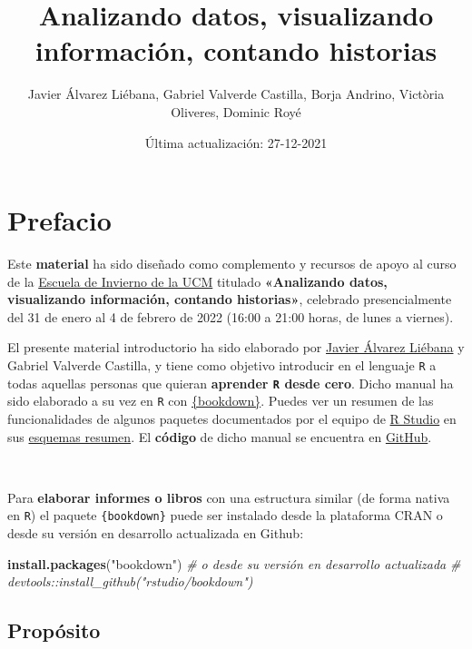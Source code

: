 \documentclass[11pt,]{book}
\title{Analizando datos, visualizando información, contando historias}
\author{Javier Álvarez Liébana, Gabriel Valverde Castilla, Borja Andrino, Victòria Oliveres, Dominic Royé}
\date{Última actualización: 27-12-2021}
\newenvironment{Shaded}{\begin{snugshade}}{\end{snugshade}}
\newcommand{\CommentTok}[1]{\textcolor[rgb]{0.37,0.37,0.37}{\textit{#1}}}
\newcommand{\KeywordTok}[1]{\textcolor[rgb]{0.27,0.27,0.27}{\textbf{#1}}}
\newcommand{\NormalTok}[1]{#1}
\newcommand{\StringTok}[1]{\textcolor[rgb]{0.5,0.5,0.5}{#1}}
\begin{document}
\maketitle

{
\hypersetup{linkcolor=}
\setcounter{tocdepth}{3}
\tableofcontents
}
\listoftables
\listoffigures
\hypertarget{prefacio}{%
\chapter*{Prefacio}\label{prefacio}}


Este \textbf{material} ha sido diseñado como complemento y recursos de apoyo al curso de la \href{https://www.ucm.es/eci//cursoecic02-pre}{Escuela de Invierno de la UCM} titulado \textbf{«Analizando datos, visualizando información, contando historias»}, celebrado presencialmente del 31 de enero al 4 de febrero de 2022 (16:00 a 21:00 horas, de lunes a viernes).

El presente material introductorio ha sido elaborado por \href{https://dadosdelaplace.github.io}{Javier Álvarez Liébana} y Gabriel Valverde Castilla, y tiene como objetivo introducir en el lenguaje \texttt{R} a todas aquellas personas que quieran \textbf{aprender \texttt{R} desde cero}. Dicho manual ha sido elaborado a su vez en \texttt{R} con \href{https://github.com/rstudio/bookdown}{\{bookdown\}}. Puedes ver un resumen de las funcionalidades de algunos paquetes documentados por el equipo de \href{https://www.rstudio.com/}{R Studio} en sus \href{https://www.rstudio.com/resources/cheatsheets/}{esquemas resumen}. El \textbf{código} de dicho manual se encuentra en \href{https://github.com/dadosdelaplace/courses-ECI-2022}{GitHub}.

~

Para \textbf{elaborar informes o libros} con una estructura similar (de forma nativa en \texttt{R}) el paquete \texttt{\{bookdown\}} puede ser instalado desde la plataforma CRAN o desde su versión en desarrollo actualizada en Github:

\begin{Shaded}
\begin{Highlighting}[]
\KeywordTok{install.packages}\NormalTok{(}\StringTok{"bookdown"}\NormalTok{)}
\CommentTok{# o desde su versión en desarrollo actualizada}
\CommentTok{# devtools::install_github("rstudio/bookdown")}
\end{Highlighting}
\end{Shaded}

\hypertarget{propuxf3sito}{%
\section*{Propósito}\label{propuxf3sito}}
\end{document}
